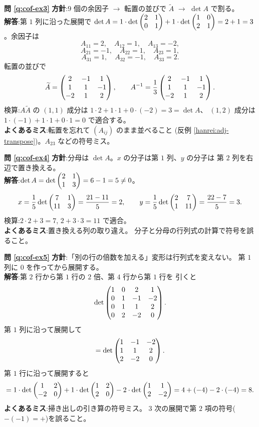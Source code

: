 \bigskip
\noindent\textbf{問 \ref{q:cof-ex3}}\quad
\textbf{方針}:$9$ 個の余因子 $\to$ 転置の並びで $\widetilde{A}$
$\to$ $\det A$ で割る。\\
\textbf{解答}:第 $1$ 列に沿った展開で
$\det A = 1 \cdot \det \begin{pmatrix}2 & 1 \\ 0 & 1\end{pmatrix} + 1 \cdot \det \begin{pmatrix}1 & 0 \\ 2 & 1\end{pmatrix}
= 2 + 1 = 3$。余因子は
\[
A_{11} = 2, \quad A_{12} = 1, \quad A_{13} = -2,
\]
\[
A_{21} = -1, \quad A_{22} = 1, \quad A_{23} = 1,
\]
\[
A_{31} = 1, \quad A_{32} = -1, \quad A_{33} = 2.
\]
転置の並びで
\[
\widetilde{A} = \begin{pmatrix}2 & -1 & 1 \\ 1 & 1 & -1 \\ -2 & 1 & 2\end{pmatrix}, \qquad
A^{-1} = \frac{1}{3}\begin{pmatrix}2 & -1 & 1 \\ 1 & 1 & -1 \\ -2 & 1 & 2\end{pmatrix}.
\]
検算:$A\widetilde{A}$ の $(1,1)$ 成分は
$1 \cdot 2 + 1 \cdot 1 + 0 \cdot (-2) = 3 = \det A$、
$(1,2)$ 成分は $1 \cdot (-1) + 1 \cdot 1 + 0 \cdot 1 = 0$ で適合する。\\
\textbf{よくあるミス}:転置を忘れて $(A_{ij})$ のまま並べること
(反例 \ref{hanrei:adj-transpose})。$A_{23}$ などの符号ミス。

\bigskip
\noindent\textbf{問 \ref{q:cof-ex4}}\quad
\textbf{方針}:分母は $\det A$。$x$ の分子は第 $1$ 列、$y$ の分子は
第 $2$ 列を右辺で置き換える。\\
\textbf{解答}:$\det A = \det \begin{pmatrix}2 & 1 \\ 1 & 3\end{pmatrix} = 6 - 1 = 5 \neq 0$。
\[
x = \frac{1}{5}\det \begin{pmatrix}7 & 1 \\ 11 & 3\end{pmatrix} = \frac{21 - 11}{5} = 2, \qquad
y = \frac{1}{5}\det \begin{pmatrix}2 & 7 \\ 1 & 11\end{pmatrix} = \frac{22 - 7}{5} = 3.
\]
検算:$2 \cdot 2 + 3 = 7$, $2 + 3 \cdot 3 = 11$ で適合。\\
\textbf{よくあるミス}:置き換える列の取り違え。
分子と分母の行列式の計算で符号を誤ること。

\bigskip
\noindent\textbf{問 \ref{q:cof-ex5}}\quad
\textbf{方針}:「別の行の倍数を加える」変形は行列式を変えない。
第 $1$ 列に $0$ を作ってから展開する。\\
\textbf{解答}:第 $2$ 行から第 $1$ 行の $2$ 倍、第 $4$ 行から第 $1$ 行を
引くと
\[
\det \begin{pmatrix}1 & 0 & 2 & 1 \\ 0 & 1 & -1 & -2 \\ 0 & 1 & 1 & 2 \\ 0 & 2 & -2 & 0\end{pmatrix}.
\]
第 $1$ 列に沿って展開して
\[
= \det \begin{pmatrix}1 & -1 & -2 \\ 1 & 1 & 2 \\ 2 & -2 & 0\end{pmatrix}.
\]
第 $1$ 行に沿って展開すると
\[
= 1 \cdot \det \begin{pmatrix}1 & 2 \\ -2 & 0\end{pmatrix} + 1 \cdot \det \begin{pmatrix}1 & 2 \\ 2 & 0\end{pmatrix}
- 2 \cdot \det \begin{pmatrix}1 & 1 \\ 2 & -2\end{pmatrix}
= 4 + (-4) - 2 \cdot (-4) = 8.
\]
\textbf{よくあるミス}:掃き出しの引き算の符号ミス。
$3$ 次の展開で第 $2$ 項の符号($-(-1) = +$)を誤ること。

